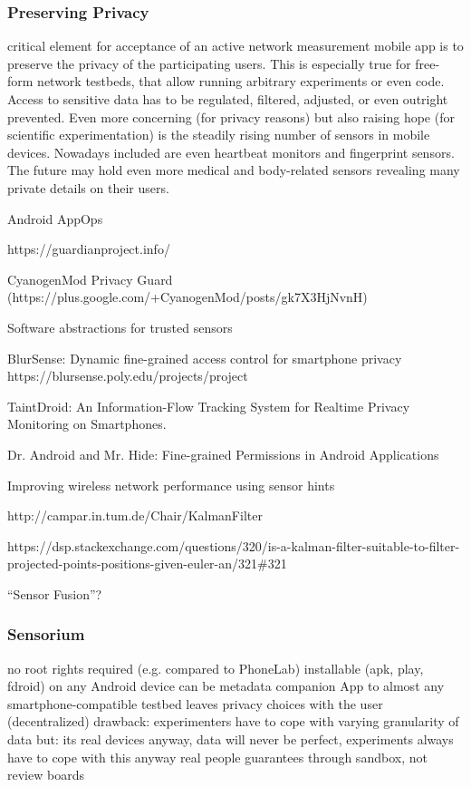 \subsubsection{Preserving Privacy}



critical element for acceptance of an active network measurement mobile app is to preserve the privacy of the participating users. This is especially true for free-form network testbeds, that allow running arbitrary experiments or even code. Access to sensitive data has to be regulated, filtered, adjusted, or even outright prevented. Even more concerning (for privacy reasons) but also raising hope (for scientific experimentation) is the steadily rising number of sensors in mobile devices. Nowadays included are even heartbeat monitors and fingerprint sensors. The future may hold even more medical and body-related sensors revealing many private details on their users.

Android AppOps

https://guardianproject.info/

CyanogenMod Privacy Guard (https://plus.google.com/+CyanogenMod/posts/gk7X3HjNvnH)

Software abstractions for trusted sensors \cite{Liu:2012:SAT:2307636.2307670}

BlurSense: Dynamic fine-grained access control for smartphone privacy~\cite{6798970}
https://blursense.poly.edu/projects/project

TaintDroid: An Information-Flow Tracking System for Realtime Privacy Monitoring on Smartphones. \cite{enck2010taintdroid}

Dr. Android and Mr. Hide: Fine-grained Permissions in Android Applications \cite{Jeon:2012:DAM:2381934.2381938}

Improving wireless network performance using sensor hints \cite{ravindranath2011improving}

http://campar.in.tum.de/Chair/KalmanFilter

https://dsp.stackexchange.com/questions/320/is-a-kalman-filter-suitable-to-filter-projected-points-positions-given-euler-an/321\#321

``Sensor Fusion''?

\subsubsection{Sensorium}


no root rights required (e.g. compared to PhoneLab)
installable (apk, play, fdroid) on any Android device
can be metadata companion App to almost any smartphone-compatible testbed
leaves privacy choices with the user (decentralized)
drawback: experimenters have to cope with varying granularity of data
but: its real devices anyway, data will never be perfect, experiments always have to cope with this anyway
real people
guarantees through sandbox, not review boards

